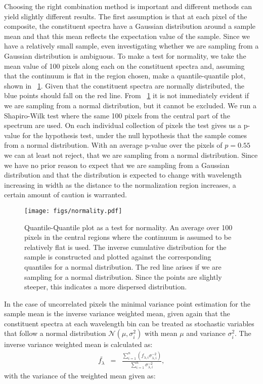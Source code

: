 \documentclass{aa}    %
\newcommand{\figref}[1]{\ref{fig:#1}}
\newcommand{\Fig}[1]{\figurename~\figref{#1}}
\newcommand{\fig}[1]{\Fig{#1}}
\newcommand{\figlabel}[1]{\label{fig:#1}}
\newcommand{\eqlabel}[1]{\label{eq:#1}}
\begin{document}
Choosing the right combination method is important and different
methods can yield slightly different results. The first assumption is
that at each pixel of the composite, the constituent spectra have a Gaussian
distribution around a sample mean and that this mean reflects the
expectation value of the sample. Since we have a relatively small
sample, even investigating whether we are sampling from a Gaussian
distribution is ambiguous. To make a test for normality, we take the
mean value of 100 pixels along each on the constituent spectra and, assuming that the continuum is
flat in the region chosen, make a quantile-quantile plot, shown in \Fig{normality}. Given that the constituent spectra are normally distributed, the blue points should
fall on the red line. From
\fig{normality} it is not immediately evident if we are sampling from
a normal distribution, but it cannot be excluded. We run a
Shapiro-Wilk test where the same 100 pixels from the central part of
the spectrum are used. On each individual collection of pixels the test
gives us a p-value for the hypothesis test,
under the null hypothesis that the sample comes from a normal
distribution. With an average p-value over the pixels of $p = 0.55$ we can at
least not reject, that we are sampling from a normal
distribution. Since we have no prior reason to expect that we are
sampling from a Gaussian distribution and that the distribution is
expected to change with wavelength increasing in width as the distance
to the normalization region increases, a certain amount of caution is
warranted.

\begin{figure}[t!]
  \centering
  \texttt{[image: figs/normality.pdf]}
  \caption[]{Quantile-Quantile plot as a test for normality. An average over 100
pixels in the central regions where the continuum is assumed to be relatively
flat is used. The inverse cumulative distribution for the sample is constructed
and plotted against the corresponding quantiles for a normal distribution. The
red line arises if we are sampling for a normal distribution. Since the points
are slightly steeper, this indicates a more dispersed distribution.}
 \figlabel{normality}
\end{figure}

In the case of uncorrelated pixels the minimal variance point estimation for the
sample mean is the inverse variance weighted mean, given again that the
constituent spectra at each wavelength bin can be treated as stochastic
variables that follow a normal distribution $\mathcal{N}(\mu, \sigma_i^2)$ with
mean $\mu$ and variance $\sigma_i^2$. The inverse variance weighted mean is
calculated as:
\begin{eqnarray} \eqlabel{wmean}
\bar{f_{\lambda}} &=& \frac{ \sum_{i=1}^n \left( f_{\lambda, i} \sigma_{\lambda,
i}^{-2} \right)}{\sum_{i=1}^n \sigma_{\lambda, i}^{-2}},
\end{eqnarray}
with the variance of the weighted mean given as: 
\end{document}
